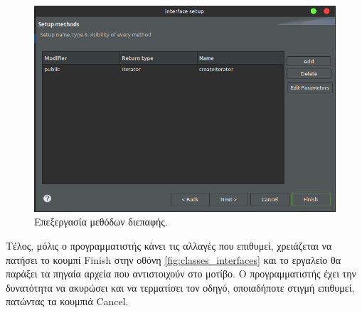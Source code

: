 \begin{figure}[H]
    \centering
    \includegraphics[width=1.0\textwidth]{Figures/edit_interface_methods.png}
    \caption{Επεξεργασία μεθόδων διεπαφής.}
    \label{fig:edit_interface_methods}
\end{figure}
Τέλος, μόλις ο προγραμματιστής κάνει τις αλλαγές που επιθυμεί, χρειάζεται να πατήσει το κουμπί Finish 
στην οθόνη \ref{fig:classes_interfaces} και το εργαλείο θα παράξει τα πηγαία αρχεία που αντιστοιχούν στο μοτίβο. 
Ο προγραμματιστής έχει την δυνατότητα να ακυρώσει και να τερματίσει τον οδηγό, οποιαδήποτε στιγμή επιθυμεί, πατώντας τα κουμπιά Cancel.
